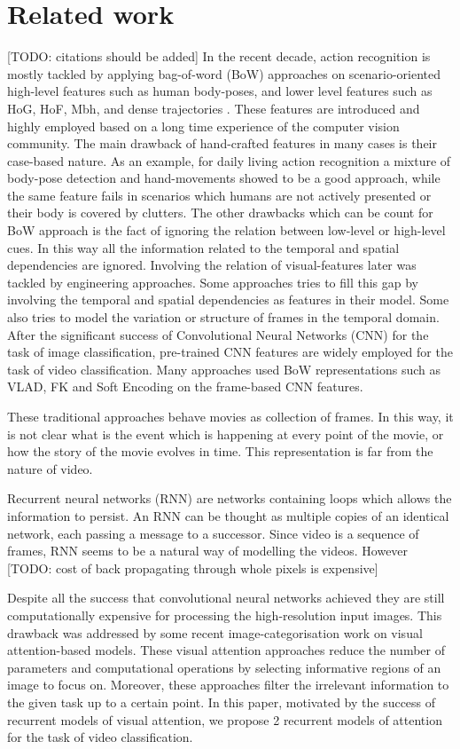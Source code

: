 \documentclass{article} %
\begin{document}
\section{Related work}
[TODO: citations should be added]
In the recent decade, action recognition is mostly tackled by applying bag-of-word (BoW) approaches on scenario-oriented high-level features such as human body-poses, and lower level features such as HoG, HoF, Mbh, and dense trajectories . These features are introduced and highly employed based on a long time experience of the computer vision community. The main drawback of hand-crafted features in many cases is their case-based nature. As an example, for daily living action recognition a mixture of body-pose detection and hand-movements showed to be a good approach, while the same feature fails in scenarios which humans are not actively presented or their body is covered by clutters. The other drawbacks which can be count for BoW approach is the fact of ignoring the relation between low-level or high-level cues. In this way all the information related to the temporal and spatial dependencies are ignored. Involving the relation of visual-features later was tackled by engineering approaches. Some approaches tries to fill this gap by involving the temporal and spatial dependencies as features in their model. Some also tries to model the variation or structure of frames in the temporal domain. 
After the significant success of Convolutional Neural Networks (CNN) for the task of image classification, pre-trained CNN features are widely employed for the task of video classification. Many approaches used BoW representations such as VLAD, FK and Soft Encoding on the frame-based CNN features.

These traditional approaches behave movies as collection of frames. In this way, it is not clear what is the event which is happening at every point of the movie, or how the story of the movie evolves in time. This representation is far from the nature of video.

Recurrent neural networks (RNN) are networks containing loops which allows the information to persist. An RNN can be thought as multiple copies of an identical network, each passing a message to a successor. Since video is a sequence of frames, RNN seems to be a natural way of modelling the videos. However [TODO: cost of back propagating through whole pixels is expensive]

Despite all the success that convolutional neural networks achieved they are still computationally expensive for processing the high-resolution input images. This drawback was addressed by some recent image-categorisation work on visual attention-based models. These visual attention approaches reduce the number of parameters and computational operations by selecting informative regions of an image to focus on. Moreover, these approaches filter the irrelevant information to the given task up to a certain point. In this paper, motivated by the success of recurrent models of visual attention, we propose 2 recurrent models of attention for the task of video classification. 
\end{document}
